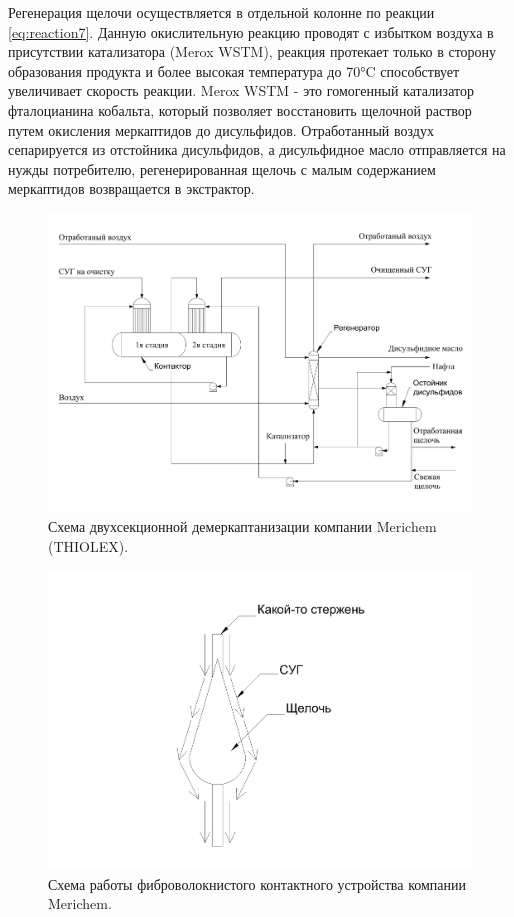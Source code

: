 Регенерация щелочи осуществляется в отдельной колонне по реакции \cref{eq:reaction7}. Данную окислительную реакцию проводят с избытком воздуха в присутствии катализатора (Merox WSTM), реакция протекает только в сторону образования продукта и более высокая температура до \num{70}°C способствует увеличивает скорость реакции. Merox WSTM - это гомогенный катализатор фталоцианина кобальта, который позволяет восстановить щелочной раствор путем окисления меркаптидов до дисульфидов. Отработанный воздух сепарируется из отстойника дисульфидов, а дисульфидное масло отправляется на нужды потребителю, регенерированная щелочь с малым содержанием меркаптидов возвращается в экстрактор.

\begin{figure}
	\centering
	\includegraphics[width=1\linewidth]{images/Eth}
	\caption{Схема двухсекционной демеркаптанизации компании Merichem (THIOLEX).}
	\label{fig:THIOLEX}
\end{figure}

\begin{figure}
	\centering
	\includegraphics[width=0.6\linewidth]{images/fibr}
	\caption{Схема работы фиброволокнистого контактного устройства компании Merichem.}
	\label{fig:FIBERFILM}
\end{figure}

